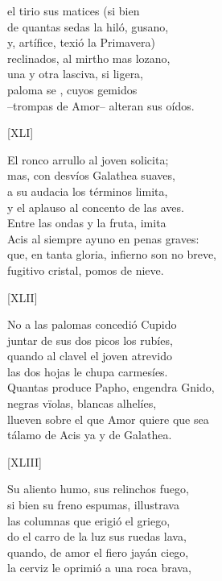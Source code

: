 \documentclass[11pt,a4paper,twoside]{article}
\begin{document}
el tirio sus matices (si bien \\
de quantas sedas la hiló, gusano,\\
y, artífice, texió la Primavera)\\
reclinados, al mirtho mas lozano,\\
una y otra lasciva, si ligera,\\
paloma se , cuyos gemidos\\
--trompas de Amor-- alteran sus oídos.\pend
\begin{center}
	[XLI]
\end{center}\pstart
El ronco arrullo al joven solicita;\\
mas, con desvíos Galathea suaves,\\
a su audacia los términos limita,\\
y el aplauso al concento de las aves.\\
Entre las ondas y la fruta, imita\\
Acis al siempre ayuno en penas graves:\\
que, en tanta gloria, infierno son no breve,\\
fugitivo cristal, pomos de nieve.\pend
\begin{center}
	[XLII]
\end{center}\pstart
No a las palomas concedió Cupido\\
juntar de sus dos picos los rubíes,\\
quando al clavel el joven atrevido\\
las dos hojas le chupa carmesíes.\\
Quantas produce Papho, engendra Gnido,\\
negras vïolas, blancas alhelíes,\\
llueven sobre el que Amor quiere que sea\\
tálamo de Acis ya y de Galathea.\pend
\begin{center}
	[XLIII]
\end{center}\pstart
Su aliento humo, sus relinchos fuego,\\
si bien su freno espumas, illustrava\\
las columnas  que erigió el griego,\\
do el carro de la luz sus ruedas lava,\\ quando, de amor el fiero jayán ciego,\\
la cerviz le oprimió a una roca brava,\\
\end{document}
